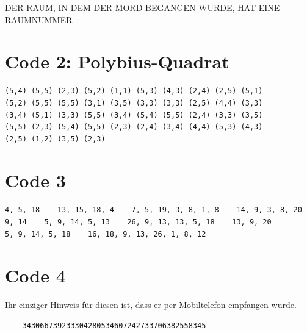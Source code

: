 \documentclass[11pt,a4paper]{report}
\begin{document}

{\pigpenfont DER RAUM, IN DEM DER MORD BEGANGEN WURDE, HAT EINE RAUMNUMMER}

\section*{Code 2: Polybius-Quadrat}

\begin{verbatim}
(5,4) (5,5) (2,3) (5,2) (1,1) (5,3) (4,3) (2,4) (2,5) (5,1) 
(5,2) (5,5) (5,5) (3,1) (3,5) (3,3) (3,3) (2,5) (4,4) (3,3) 
(3,4) (5,1) (3,3) (5,5) (3,4) (5,4) (5,5) (2,4) (3,3) (3,5) 
(5,5) (2,3) (5,4) (5,5) (2,3) (2,4) (3,4) (4,4) (5,3) (4,3) 
(2,5) (1,2) (3,5) (2,3)
\end{verbatim}

\section*{Code 3}
\begin{verbatim}
4, 5, 18    13, 15, 18, 4    7, 5, 19, 3, 8, 1, 8    14, 9, 3, 8, 20
9, 14    5, 9, 14, 5, 13    26, 9, 13, 13, 5, 18    13, 9, 20
5, 9, 14, 5, 18    16, 18, 9, 13, 26, 1, 8, 12
\end{verbatim}

\section*{Code 4}
Ihr einziger Hinweis für diesen ist, dass er per Mobiltelefon empfangen wurde.

\begin{verbatim}
    343066739233304280534607242733706382558345
\end{verbatim}
\end{document}
